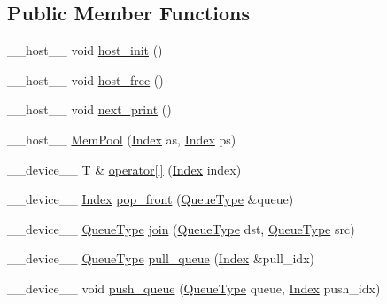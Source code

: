 \subsection*{Public Member Functions}
\begin{DoxyCompactItemize}
\item 
\-\_\-\-\_\-host\-\_\-\-\_\- void \hyperlink{structMemPool_ac3ad49fa7037c1f7ee36c82e8c1ea965}{host\-\_\-init} ()
\item 
\-\_\-\-\_\-host\-\_\-\-\_\- void \hyperlink{structMemPool_a3bb2fee529a330549aba7af05ad767c3}{host\-\_\-free} ()
\item 
\-\_\-\-\_\-host\-\_\-\-\_\- void \hyperlink{structMemPool_a470b68b4976333111773be8751b24a9a}{next\-\_\-print} ()
\item 
\-\_\-\-\_\-host\-\_\-\-\_\- \hyperlink{structMemPool_a7ec40c2406b040e7c1488ea0eb176a17}{Mem\-Pool} (\hyperlink{structMemPool_adf9fcd1cb44028899c45761a29b7d43f}{Index} as, \hyperlink{structMemPool_adf9fcd1cb44028899c45761a29b7d43f}{Index} ps)
\item 
\-\_\-\-\_\-device\-\_\-\-\_\- T \& \hyperlink{structMemPool_aa2b0b8b9ed86056d49fa8de145e3d27f}{operator\mbox{[}$\,$\mbox{]}} (\hyperlink{structMemPool_adf9fcd1cb44028899c45761a29b7d43f}{Index} index)
\item 
\-\_\-\-\_\-device\-\_\-\-\_\- \hyperlink{structMemPool_adf9fcd1cb44028899c45761a29b7d43f}{Index} \hyperlink{structMemPool_a49ae0d6199a1e435e06136c61a88e155}{pop\-\_\-front} (\hyperlink{structMemPool_a6044c1fc80a16b30462127a56e47ab98}{Queue\-Type} \&queue)
\item 
\-\_\-\-\_\-device\-\_\-\-\_\- \hyperlink{structMemPool_a6044c1fc80a16b30462127a56e47ab98}{Queue\-Type} \hyperlink{structMemPool_a8a7089a4cb741cb6244d1192a90e3fc9}{join} (\hyperlink{structMemPool_a6044c1fc80a16b30462127a56e47ab98}{Queue\-Type} dst, \hyperlink{structMemPool_a6044c1fc80a16b30462127a56e47ab98}{Queue\-Type} src)
\item 
\-\_\-\-\_\-device\-\_\-\-\_\- \hyperlink{structMemPool_a6044c1fc80a16b30462127a56e47ab98}{Queue\-Type} \hyperlink{structMemPool_a8659b0901774035def7caca7b0032546}{pull\-\_\-queue} (\hyperlink{structMemPool_adf9fcd1cb44028899c45761a29b7d43f}{Index} \&pull\-\_\-idx)
\item 
\-\_\-\-\_\-device\-\_\-\-\_\- void \hyperlink{structMemPool_a8a233b3a03a286ecc7a7b1f5dc4dedcd}{push\-\_\-queue} (\hyperlink{structMemPool_a6044c1fc80a16b30462127a56e47ab98}{Queue\-Type} queue, \hyperlink{structMemPool_adf9fcd1cb44028899c45761a29b7d43f}{Index} push\-\_\-idx)
\item 

\end{DoxyCompactItemize}
